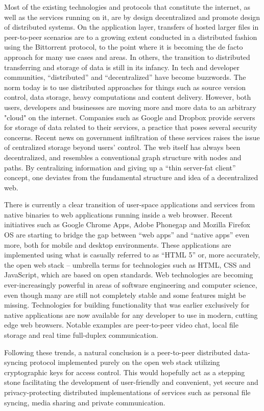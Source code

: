 Most of the existing technologies and protocols that constitute the internet, as well as the services running on it, are by design decentralized and promote design of distributed systems. On the application layer, transfers of hosted larger files in peer-to-peer scenarios are to a growing extent conducted in a distributed fashion using the Bittorrent protocol, to the point where it is becoming the de facto approach for many use cases and areas. In others, the transition to distributed transferring and storage of data is still in its infancy. In tech and developer communities, “distributed” and “decentralized” have become buzzwords. The norm today is to use distributed approaches for things such as source version control, data storage, heavy computations and content delivery.
However, both users, developers and businesses are moving more and more data to an arbitrary "cloud" on the internet. Companies such as Google and Dropbox provide servers for storage of data related to their services, a practice that poses several security concerns. Recent news on government infiltration of these services raises the issue of centralized storage beyond users’ control. The web itself has always been decentralized, and resembles a conventional graph structure with nodes and paths. By centralizing information and giving up a “thin server-fat client” concept, one deviates from the fundamental structure and idea of a decentralized web.

There is currently a clear transition of user-space applications and services from native binaries to web applications running inside a web browser. Recent initiatives such as Google Chrome Apps, Adobe Phonegap and Mozilla Firefox OS are starting to bridge the gap between “web apps” and “native apps” even more, both for mobile and desktop environments. These applications are implemented using what is casually referred to as “HTML 5” or, more accurately, the open web stack – umbrella terms for technologies such as HTML, CSS and JavaScript, which are based on open standards. Web technologies are becoming ever-increasingly powerful in areas of software engineering and computer science, even though many are still not completely stable and some features might be missing. Technologies for building functionality that was earlier exclusively for native applications are now available for any developer to use in modern, cutting edge web browsers. Notable examples are peer-to-peer video chat, local file storage and real time full-duplex communication.

Following these trends, a natural conclusion is a peer-to-peer distributed data-syncing protocol implemented purely on the open web stack utilizing cryptographic keys for access control. This would hopefully act as a stepping stone facilitating the development of user-friendly and convenient, yet secure and privacy-protecting distributed implementations of services such as personal file syncing, media sharing and private communication.
